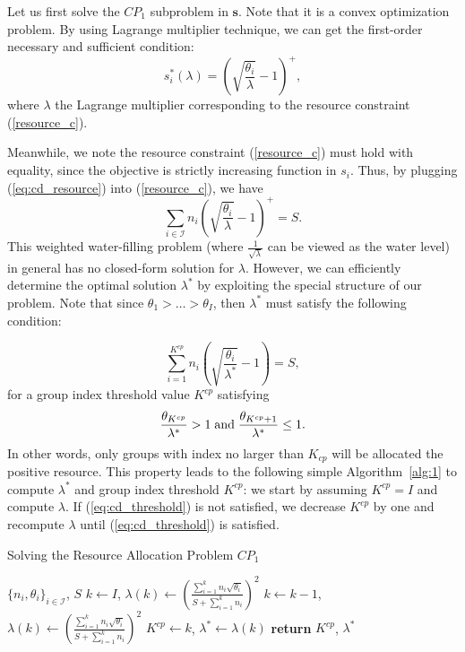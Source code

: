 \documentclass[twocolumn,10pt,twosided]{IEEEtran}
\begin{document}
Let us first solve the $CP_1$ subproblem   in $\boldsymbol{s}$. Note that it is a convex optimization problem. By using Lagrange multiplier technique, we can get the first-order necessary and sufficient condition:
\begin{equation}
\label{eq:cd_resource}
s^*_{i}(\lambda) = \left(\sqrt{\frac{\theta_i}{\lambda}}-1\right)^+,
\end{equation}
where $\lambda$  the Lagrange multiplier corresponding to the resource constraint (\ref{resource_c}).

Meanwhile, we note the resource constraint (\ref{resource_c}) must hold with
equality, since the objective is strictly increasing function in $s_{i}$. Thus, by plugging (\ref{eq:cd_resource}) into (\ref{resource_c}), we have
\begin{equation}
\label{eq:cd_water_filling}
    \sum\limits_{i\in\mathcal{I}} n_i \left(\sqrt{\frac{\theta_i}{\lambda}}-1\right)^+ = S.
\end{equation}
This weighted water-filling problem (where $\frac{1}{\sqrt{\lambda}}$ can be viewed as the water level) in general has no closed-form solution  for $\lambda$. However, we can efficiently determine the optimal solution $\lambda^*$ by exploiting the special structure of our problem. Note that since $\theta_1>\dots>\theta_I$, then $\lambda^*$ must satisfy  the following condition:

\begin{equation}
\label{eq:water-filling_cpd}
    \sum_{i=1}^{K^{cp}} n_i\left(\sqrt{\frac{\theta_i}{\lambda^*}}-1\right)=S,
\end{equation}
for a group index threshold value $K^{cp}$ satisfying
\begin{equation}
\label{eq:cd_threshold}
\frac{\theta_{K^{cp}}}{\lambda^*}> 1\; {\rm{and}}\; \frac{\theta_{K^{cp}+1}}{\lambda^*}\le 1.
\end{equation}
In other words, only groups with index no larger than $K_{cp}$ will be allocated the positive resource.
This property leads to the following simple Algorithm~\ref{alg:1} to compute $\lambda^*$ and group index threshold $K^{cp}$: we start by assuming $K^{cp}=I$ and compute $\lambda$. If (\ref{eq:cd_threshold}) is not satisfied, we decrease $K^{cp}$ by one and recompute $\lambda$ until (\ref{eq:cd_threshold}) is satisfied.
\begin{algorithm}\caption{Solving the Resource Allocation Problem $CP_1$}     \label{alg:1}
\begin{algorithmic}[1]
  {$\{n_i,\theta_i\}_{i\in{\mathcal{I}}}$, $S$}
    \State $k\gets I$,  $\lambda(k) \gets \left(\frac{\sum_{i=1}^{k} n_i \sqrt {\theta_i}}{S+\sum_{i=1}^{k}n_i}\right)^2$
        \State $k \gets k-1$,  $\lambda(k) \gets \left(\frac{\sum_{i=1}^{k} n_i \sqrt {\theta_i}}{S+\sum_{i=1}^{k}n_i}\right)^2$
    \EndWhile
    \State $K^{cp}\gets k$, $\lambda^*\gets\lambda(k)$
\State \textbf{return} $K^{cp}$, $\lambda^*$
\EndFunction
\end{algorithmic}                       \end{algorithm}
\end{document}
